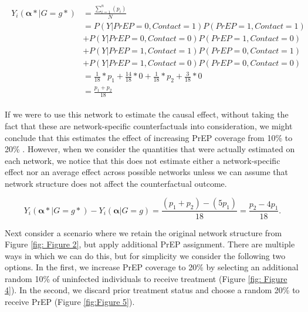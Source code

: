 \documentclass{article}
\theoremstyle{definition}
\begin{document}
\begin{align}\label{eq:11}
\begin{split}
Y_{i}\left(\mathbf{\alpha*}|G=g*\right) & = \frac{\sum_{i=1}^{n}(p_{i})}{N}  \\ 
& = P\left(Y|PrEP = 0, Contact = 1\right)P\left(PrEP = 1, Contact = 1\right)  \\ \nonumber
& +P\left(Y|PrEP = 0, Contact = 0\right)P\left(PrEP = 1, Contact = 0\right)  \\ \nonumber
& +P\left(Y|PrEP = 1, Contact = 1\right)P\left(PrEP = 0, Contact = 1\right) \\ \nonumber
&  +P\left(Y|PrEP = 1, Contact = 0\right)P\left(PrEP = 0, Contact = 0\right) \\ \nonumber
 &= \frac{1}{18}*p_1 +  \frac{14}{18}*0 +\frac{1}{18}*p_2 +  \frac{3}{18}*0 \\ \nonumber
 &=\frac{p_1+p_2}{18}  \nonumber
 \end{split}
\end{align}

If we were to use this network to estimate the causal effect, without taking the fact that these are network-specific counterfactuals into consideration, we might conclude that this estimates the effect of increasing PrEP coverage from 10\% to 20\% . However, when we consider the quantities that were actually estimated on each network, we notice that this does not estimate either a network-specific effect nor an average effect across possible networks unless we can assume that network structure does not affect the counterfactual outcome. 

\begin{equation}\label{eq:12}
Y_{i}\left(\mathbf{\alpha*}|G=g*\right) -Y_{i}\left(\mathbf{\alpha}|G=g\right) = \frac{\left(p_1 +p_2\right)-\left(5p_1\right)}{18}= \frac{p_2-4p_1}{18}.
\end{equation}


Next consider a scenario where we retain the original network structure from Figure \ref{fig: Figure 2}, but apply additional PrEP assignment. There are multiple ways in which we can do this, but for simplicity we consider the following two options. In the first, we increase PrEP coverage to 20\% by selecting an additional random 10\% of uninfected individuals to receive treatment (Figure \ref{fig: Figure 4}). In the second, we discard prior treatment status and choose a random 20\% to receive PrEP (Figure \ref{fig:Figure 5}).
\end{document}
